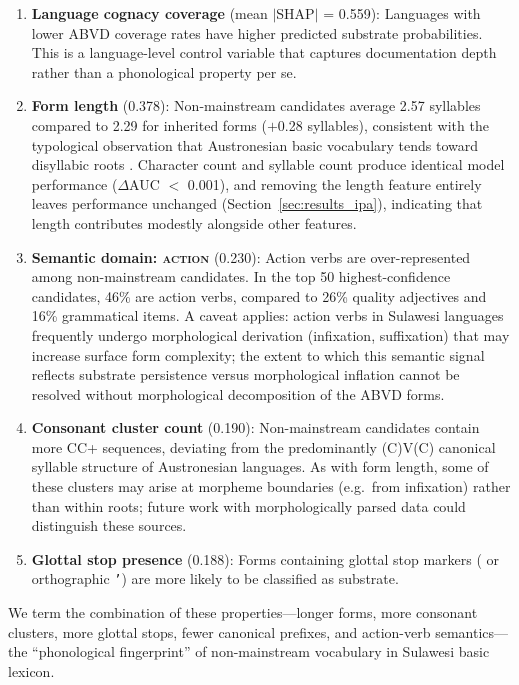 \documentclass[12pt]{article}
\begin{document}
\begin{enumerate}
    \item \textbf{Language cognacy coverage} (mean $|$SHAP$|$ = 0.559): Languages with lower ABVD coverage rates have higher predicted substrate probabilities. This is a language-level control variable that captures documentation depth rather than a phonological property per se.
    \item \textbf{Form length} (0.378): Non-mainstream candidates average 2.57 syllables compared to 2.29 for inherited forms ($+$0.28 syllables), consistent with the typological observation that Austronesian basic vocabulary tends toward disyllabic roots \citep{blust2009}. Character count and syllable count produce identical model performance ($\Delta$AUC $<$ 0.001), and removing the length feature entirely leaves performance unchanged (Section~\ref{sec:results_ipa}), indicating that length contributes modestly alongside other features.
    \item \textbf{Semantic domain: \textsc{action}} (0.230): Action verbs are over-represented among non-mainstream candidates. In the top 50 highest-confidence candidates, 46\% are action verbs, compared to 26\% quality adjectives and 16\% grammatical items. A caveat applies: action verbs in Sulawesi languages frequently undergo morphological derivation (infixation, suffixation) that may increase surface form complexity; the extent to which this semantic signal reflects substrate persistence versus morphological inflation cannot be resolved without morphological decomposition of the ABVD forms.
    \item \textbf{Consonant cluster count} (0.190): Non-mainstream candidates contain more CC+ sequences, deviating from the predominantly (C)V(C) canonical syllable structure of Austronesian languages. As with form length, some of these clusters may arise at morpheme boundaries (e.g.\ from infixation) rather than within roots; future work with morphologically parsed data could distinguish these sources.
    \item \textbf{Glottal stop presence} (0.188): Forms containing glottal stop markers ( or orthographic \texttt{'}) are more likely to be classified as substrate.
\end{enumerate}

We term the combination of these properties---longer forms, more consonant clusters, more glottal stops, fewer canonical prefixes, and action-verb semantics---the ``phonological fingerprint'' of non-mainstream vocabulary in Sulawesi basic lexicon.
\end{document}
